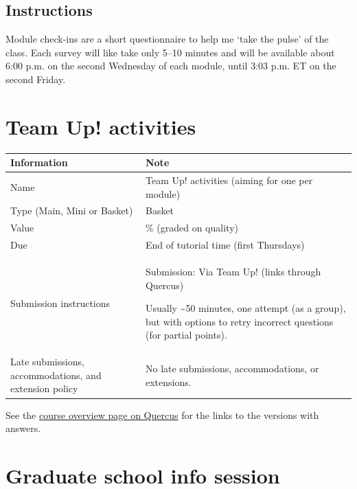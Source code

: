 \documentclass[
  openany]{book}
\begin{document}
\hypertarget{instructions-7}{%
\subsection{Instructions}\label{instructions-7}}

Module check-ins are a short questionnaire to help me `take the pulse' of the class. Each survey will like take only 5--10 minutes and will be available about 6:00 p.m. on the second Wednesday of each module, until 3:03 p.m. ET on the second Friday.

\hypertarget{team-up-activities}{%
\section{Team Up! activities}\label{team-up-activities}}

\begin{longtable}[]{@{}
  >{\raggedright\arraybackslash}p{}
  >{\raggedright\arraybackslash}p{}@{}}
\toprule
\textbf{Information} & \textbf{Note} \\
\midrule
\endhead
Name & Team Up! activities (aiming for one per module) \\
Type (Main, Mini or Basket) & Basket \\
Value & 0.5\% (graded on quality) \\
Due & End of tutorial time (first Thursdays) \\
Submission instructions & Submission: Via Team Up! (links through Quercus)

Usually \textasciitilde50 minutes, one attempt (as a group), but with options to retry incorrect questions (for partial points). \\
Late submissions, accommodations, and extension policy & No late submissions, accommodations, or extensions. \\
\bottomrule
\end{longtable}

See the \href{https://q.utoronto.ca/courses/253305/pages/course-overview}{course overview page on Quercus} for the links to the versions with answers.

\hypertarget{graduate-school-info-session}{%
\section{Graduate school info session}\label{graduate-school-info-session}}
\end{document}
